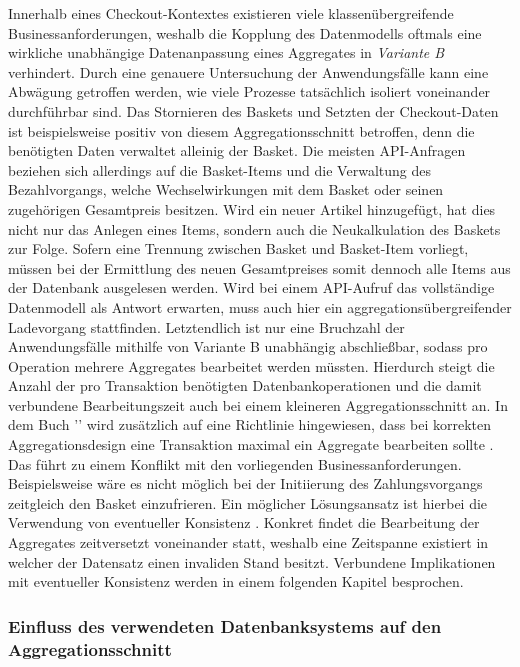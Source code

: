 Innerhalb eines Checkout-Kontextes existieren viele klassenübergreifende Businessanforderungen, weshalb die Kopplung des Datenmodells oftmals eine wirkliche unabhängige Datenanpassung eines Aggregates in \emph{Variante B} verhindert. Durch eine genauere Untersuchung der Anwendungsfälle kann eine Abwägung getroffen werden, wie viele Prozesse tatsächlich isoliert voneinander durchführbar sind. Das Stornieren des Baskets und Setzten der Checkout-Daten ist beispielsweise positiv von diesem Aggregationsschnitt betroffen, denn die benötigten Daten verwaltet alleinig der Basket. Die meisten API-Anfragen beziehen sich allerdings auf die Basket-Items und die Verwaltung des Bezahlvorgangs, welche Wechselwirkungen mit dem Basket oder seinen zugehörigen Gesamtpreis besitzen. Wird ein neuer Artikel hinzugefügt, hat dies nicht nur das Anlegen eines Items, sondern auch die Neukalkulation des Baskets zur Folge. Sofern eine Trennung zwischen Basket und Basket-Item vorliegt, müssen bei der Ermittlung des neuen Gesamtpreises somit dennoch alle Items aus der Datenbank ausgelesen werden. Wird bei einem API-Aufruf das vollständige Datenmodell als Antwort erwarten, muss auch hier ein aggregationsübergreifender Ladevorgang stattfinden. Letztendlich ist nur eine Bruchzahl der Anwendungsfälle mithilfe von Variante B unabhängig abschließbar, sodass pro Operation mehrere Aggregates bearbeitet werden müssten. Hierdurch steigt die Anzahl der pro Transaktion benötigten Datenbankoperationen und die damit verbundene Bearbeitungszeit auch bei einem kleineren Aggregationsschnitt an. In dem Buch '' wird zusätzlich auf eine Richtlinie hingewiesen, dass bei korrekten Aggregationsdesign eine Transaktion maximal ein Aggregate bearbeiten sollte \cite[S. 354]{Vernon.2015}. Das führt zu einem Konflikt mit den vorliegenden Businessanforderungen. Beispielsweise wäre es nicht möglich bei der Initiierung des Zahlungsvorgangs zeitgleich den Basket einzufrieren. Ein möglicher Lösungsansatz ist hierbei die Verwendung von eventueller Konsistenz \cite[S. 364]{Vernon.2015}. Konkret findet die Bearbeitung der Aggregates zeitversetzt voneinander statt, weshalb eine Zeitspanne existiert in welcher der Datensatz einen invaliden Stand besitzt. Verbundene Implikationen mit eventueller Konsistenz werden in einem folgenden Kapitel besprochen.

\subsubsection{Einfluss des verwendeten Datenbanksystems auf den Aggregationsschnitt}

